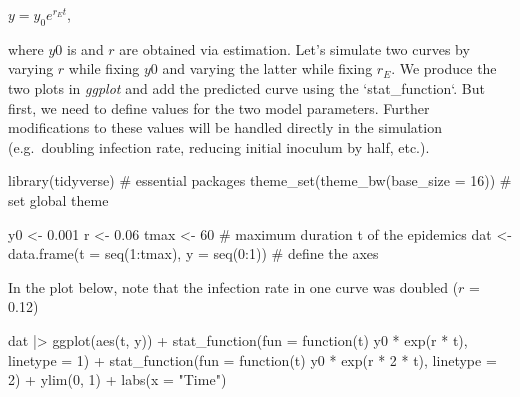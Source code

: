 \documentclass[
  letterpaper,
  DIV=11,
  numbers=noendperiod]{scrreprt}
\newenvironment{Shaded}{\begin{snugshade}}{\end{snugshade}}
\newcommand{\AttributeTok}[1]{\textcolor[rgb]{0.40,0.45,0.13}{#1}}
\newcommand{\CommentTok}[1]{\textcolor[rgb]{0.37,0.37,0.37}{#1}}
\newcommand{\ControlFlowTok}[1]{\textcolor[rgb]{0.00,0.23,0.31}{#1}}
\newcommand{\DecValTok}[1]{\textcolor[rgb]{0.68,0.00,0.00}{#1}}
\newcommand{\FloatTok}[1]{\textcolor[rgb]{0.68,0.00,0.00}{#1}}
\newcommand{\FunctionTok}[1]{\textcolor[rgb]{0.28,0.35,0.67}{#1}}
\newcommand{\NormalTok}[1]{\textcolor[rgb]{0.00,0.23,0.31}{#1}}
\newcommand{\OtherTok}[1]{\textcolor[rgb]{0.00,0.23,0.31}{#1}}
\newcommand{\SpecialCharTok}[1]{\textcolor[rgb]{0.37,0.37,0.37}{#1}}
\newcommand{\StringTok}[1]{\textcolor[rgb]{0.13,0.47,0.30}{#1}}
\begin{document}
\(y = y_0 e^{r_Et}\),

where \(y0\) is and \(r\) are obtained via estimation. Let's simulate
two curves by varying \(r\) while fixing \(y0\) and varying the latter
while fixing \(r_E\). We produce the two plots in \emph{ggplot} and add
the predicted curve using the `stat\_function`. But first, we need to
define values for the two model parameters. Further modifications to
these values will be handled directly in the simulation (e.g.~doubling
infection rate, reducing initial inoculum by half, etc.).

\begin{Shaded}
\begin{Highlighting}[]
\FunctionTok{library}\NormalTok{(tidyverse) }\CommentTok{\# essential packages }
\FunctionTok{theme\_set}\NormalTok{(}\FunctionTok{theme\_bw}\NormalTok{(}\AttributeTok{base\_size =} \DecValTok{16}\NormalTok{)) }\CommentTok{\# set global theme}
\end{Highlighting}
\end{Shaded}

\begin{Shaded}
\begin{Highlighting}[]
\NormalTok{y0 }\OtherTok{\textless{}{-}} \FloatTok{0.001} 
\NormalTok{r }\OtherTok{\textless{}{-}} \FloatTok{0.06} 
\NormalTok{tmax }\OtherTok{\textless{}{-}} \DecValTok{60} \CommentTok{\# maximum duration t of the epidemics}
\NormalTok{dat }\OtherTok{\textless{}{-}} \FunctionTok{data.frame}\NormalTok{(}\AttributeTok{t =} \FunctionTok{seq}\NormalTok{(}\DecValTok{1}\SpecialCharTok{:}\NormalTok{tmax), }\AttributeTok{y =} \FunctionTok{seq}\NormalTok{(}\DecValTok{0}\SpecialCharTok{:}\DecValTok{1}\NormalTok{)) }\CommentTok{\# define the axes}
\end{Highlighting}
\end{Shaded}

In the plot below, note that the infection rate in one curve was doubled
(\(r\) = 0.12)

\begin{Shaded}
\begin{Highlighting}[]
\NormalTok{dat }\SpecialCharTok{|\textgreater{}}
  \FunctionTok{ggplot}\NormalTok{(}\FunctionTok{aes}\NormalTok{(t, y)) }\SpecialCharTok{+}
  \FunctionTok{stat\_function}\NormalTok{(}\AttributeTok{fun =} \ControlFlowTok{function}\NormalTok{(t) y0 }\SpecialCharTok{*} \FunctionTok{exp}\NormalTok{(r }\SpecialCharTok{*}\NormalTok{ t), }\AttributeTok{linetype =} \DecValTok{1}\NormalTok{) }\SpecialCharTok{+}
  \FunctionTok{stat\_function}\NormalTok{(}\AttributeTok{fun =} \ControlFlowTok{function}\NormalTok{(t) y0 }\SpecialCharTok{*} \FunctionTok{exp}\NormalTok{(r }\SpecialCharTok{*} \DecValTok{2} \SpecialCharTok{*}\NormalTok{ t), }\AttributeTok{linetype =} \DecValTok{2}\NormalTok{) }\SpecialCharTok{+}
  \FunctionTok{ylim}\NormalTok{(}\DecValTok{0}\NormalTok{, }\DecValTok{1}\NormalTok{) }\SpecialCharTok{+}
  \FunctionTok{labs}\NormalTok{(}\AttributeTok{x =} \StringTok{"Time"}\NormalTok{)}
\end{Highlighting}
\end{Shaded}
\end{document}
